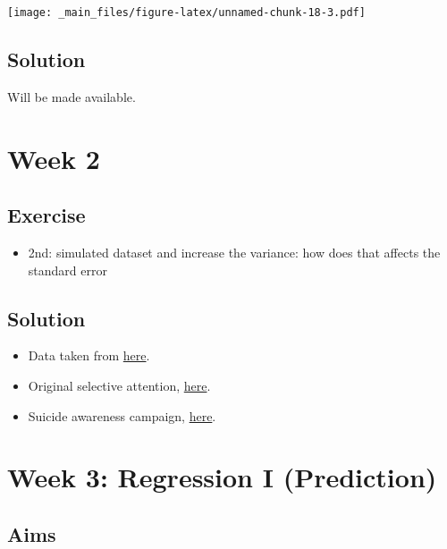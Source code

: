 \documentclass[
]{book}
\providecommand{\tightlist}{%
  \setlength{\itemsep}{0pt}\setlength{\parskip}{0pt}}
\begin{document}
\texttt{[image: \_main\_files/figure-latex/unnamed-chunk-18-3.pdf]}

\hypertarget{solution}{%
\section{Solution}\label{solution}}

Will be made available.

\hypertarget{week-2}{%
\chapter{Week 2}\label{week-2}}

\hypertarget{exercise}{%
\section{Exercise}\label{exercise}}

\begin{itemize}
\tightlist
\item
  2nd: simulated dataset and increase the variance: how does that affects the standard error
\end{itemize}

\hypertarget{solution-1}{%
\section{Solution}\label{solution-1}}

\begin{itemize}
\item
  Data taken from \href{https://communities.sas.com/t5/Graphics-Programming/Fun-With-SAS-ODS-Graphics-Don-t-Miss-the-Gorilla-in-the-Data/td-p/697286}{here}.
\item
  Original selective attention, \href{https://www.youtube.com/watch?v=vJG698U2Mvo}{here}.
\item
  Suicide awareness campaign, \href{https://www.youtube.com/watch?v=Lw-YPKR0grk}{here}.
\end{itemize}

\hypertarget{week-3-regression-i-prediction}{%
\chapter{Week 3: Regression I (Prediction)}\label{week-3-regression-i-prediction}}

\hypertarget{aims-1}{%
\section{Aims}\label{aims-1}}
\end{document}
